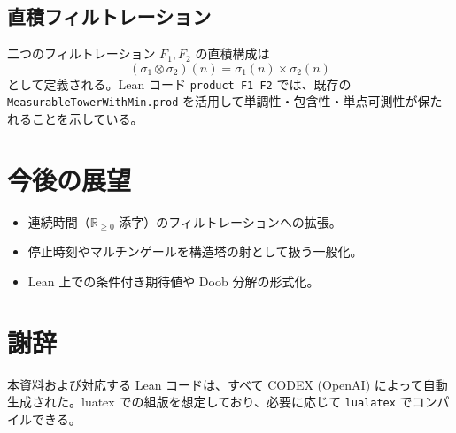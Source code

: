 \documentclass[a4paper]{ltjsarticle}
\theoremstyle{remark}
\begin{document}
\subsection{直積フィルトレーション}

二つのフィルトレーション $F_1,F_2$ の直積構成は
\[
(\sigma_1 \otimes \sigma_2)(n) = \sigma_1(n) \times \sigma_2(n)
\]
として定義される。Lean コード \texttt{product F1 F2} では、既存の \texttt{MeasurableTowerWithMin.prod} を活用して単調性・包含性・単点可測性が保たれることを示している。


\section{今後の展望}

\begin{itemize}[nosep]
  \item 連続時間（$\mathbb{R}_{\ge 0}$ 添字）のフィルトレーションへの拡張。
  \item 停止時刻やマルチンゲールを構造塔の射として扱う一般化。
  \item Lean 上での条件付き期待値や Doob 分解の形式化。
\end{itemize}

\section*{謝辞}

本資料および対応する Lean コードは、すべて CODEX (OpenAI) によって自動生成された。luatex での組版を想定しており、必要に応じて \texttt{lualatex} でコンパイルできる。
\end{document}
